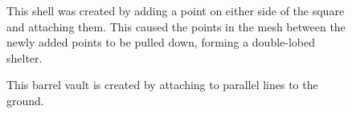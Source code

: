\documentclass{thesis}
\begin{document}
\begin{figure}
\caption[Adding points]{This shell was created by adding a point on either side of the square and attaching them.  This
caused the points in the mesh between the newly added points to be pulled down, forming a double-lobed shelter.}
\label{fig:waist}
\end{figure}

\begin{figure}
\caption[A barrel vault]{This barrel vault is created by attaching to parallel lines to the ground.}
\label{fig:barrel_vault}
\end{figure}
\end{document}
